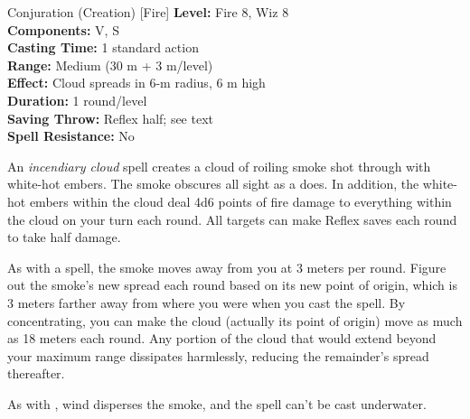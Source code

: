 {Conjuration (Creation) [Fire]}
{
	\textbf{Level:}
	Fire 8, Wiz 8\\
	\textbf{Components:}
	V, S\\
	\textbf{Casting Time:}
	1 standard action\\
	\textbf{Range:}
	Medium (30 m + 3 m/level)\\
	\textbf{Effect:}
	Cloud spreads in 6-m radius, 6 m high\\
	\textbf{Duration:}
	1 round/level\\
	\textbf{Saving Throw:}
	Reflex half; see text\\
	\textbf{Spell Resistance:}
	No\\
}
{
	An \emph{incendiary cloud} spell creates a cloud of roiling smoke shot through with white-hot embers. The smoke obscures all sight as a  does. In addition, the white-hot embers within the cloud deal 4d6 points of fire damage to everything within the cloud on your turn each round. All targets can make Reflex saves each round to take half damage.

	As with a  spell, the smoke moves away from you at 3 meters per round. Figure out the smoke's new spread each round based on its new point of origin, which is 3 meters farther away from where you were when you cast the spell. By concentrating, you can make the cloud (actually its point of origin) move as much as 18 meters each round. Any portion of the cloud that would extend beyond your maximum range dissipates harmlessly, reducing the remainder's spread thereafter.

	As with , wind disperses the smoke, and the spell can't be cast underwater.

}
